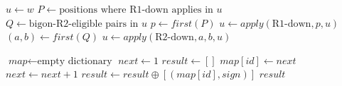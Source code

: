 \begin{algorithm}[t]
\caption{Greedy bigon peeling (single pass)}
\label{alg:bigon-peel}
\begin{algorithmic}[1]
\State $u \gets w$
  \State $P \gets \text{positions where R1-down applies in } u$
  \State $Q \gets \text{bigon-R2-eligible pairs in } u$
    \State $p \gets \textit{first}(P)$
    \State $u \gets \textit{apply}(\text{R1-down}, p, u)$
    \State $(a,b) \gets \textit{first}(Q)$
    \State $u \gets \textit{apply}(\text{R2-down}, a, b, u)$
  \Else
    \Return \False {}
  \EndIf
\EndWhile
\Return \True
\end{algorithmic}
\end{algorithm}

\begin{algorithm}[t]
\caption{Canonicalization}
\label{alg:canonical}
\begin{algorithmic}[1]
\State $\textit{map} \gets \text{empty dictionary}$
\State $\textit{next} \gets 1$
\State $\textit{result} \gets []$
    \State $\textit{map}[id] \gets \textit{next}$
    \State $\textit{next} \gets \textit{next} + 1$
  \EndIf
  \State $\textit{result} \gets \textit{result} \oplus [(\textit{map}[id], sign)]$
\EndFor
\Return $\textit{result}$
\end{algorithmic}
\end{algorithm}
